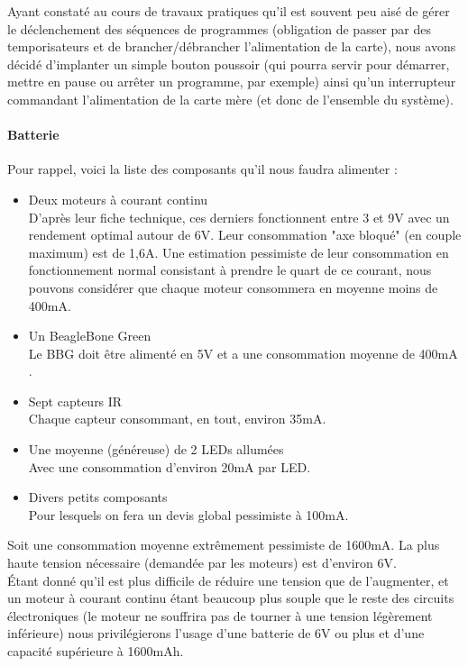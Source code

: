 			Ayant constaté au cours de travaux pratiques qu'il est souvent peu aisé de gérer le déclenchement des séquences de programmes (obligation de passer par des temporisateurs et de brancher/débrancher l'alimentation de la carte), nous avons décidé d'implanter un simple bouton poussoir (qui pourra servir pour démarrer, mettre en pause ou arrêter un programme, par exemple) ainsi qu'un interrupteur commandant l'alimentation de la carte mère (et donc de l'ensemble du système).

		\paragraph{Batterie}

			Pour rappel, voici la liste des composants qu'il nous faudra alimenter :
			\begin{itemize}
				\item Deux moteurs à courant continu\\
				D'après leur fiche technique\cite{bib8}, ces derniers fonctionnent entre 3 et 9V avec un rendement optimal autour de 6V. Leur consommation "axe bloqué" (en couple maximum) est de 1,6A. Une estimation pessimiste de leur consommation en fonctionnement normal consistant à prendre le quart de ce courant, nous pouvons considérer que chaque moteur consommera en moyenne moins de 400mA.
				\item Un BeagleBone Green\\
				Le BBG doit être alimenté en 5V et a une consommation moyenne de 400mA \cite{bib13}.
				\item Sept capteurs IR\\
				Chaque capteur consommant, en tout, environ 35mA.
				\item Une moyenne (généreuse) de 2 LEDs allumées\\
				Avec une consommation d'environ 20mA par LED.
				\item Divers petits composants\\
				Pour lesquels on fera un devis global pessimiste à 100mA.
			\end{itemize}

			Soit une consommation moyenne extrêmement pessimiste de 1600mA.
			La plus haute tension nécessaire (demandée par les moteurs) est d'environ 6V.\\

			Étant donné qu'il est plus difficile de réduire une tension que de l'augmenter, et un moteur à courant continu étant beaucoup plus souple que le reste des circuits électroniques (le moteur ne souffrira pas de tourner à une tension légèrement inférieure) nous privilégierons l'usage d'une batterie de 6V ou plus et d'une capacité supérieure à 1600mAh.


